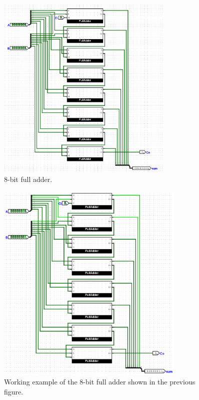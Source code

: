 \documentclass{article}
\begin{document}
\begin{figure}[H]
    \centering
    \includegraphics[width=0.75\textwidth]{./images/8-bit_full_adder.png}
    \caption{8-bit full adder.}
\end{figure}

\begin{figure}[H]
    \centering
    \includegraphics[width=0.8\textwidth]{./images/working_8-bit_full_adder.png}
    \caption{Working example of the 8-bit full adder shown in the previous figure.}
\end{figure}
\end{document}
